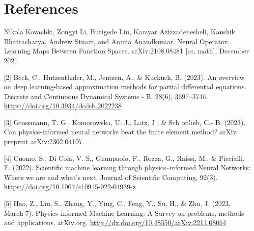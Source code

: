 \documentclass[a4paper, onecolumn, 12pt]{article}
\begin{document}
\newpage
\section*{References}
\singlespacing
[1] Nikola Kovachki, Zongyi Li, Burigede Liu, Kamyar Azizzadenesheli, Kaushik Bhattacharya, Andrew Stuart, and
Anima Anandkumar. Neural Operator: Learning Maps Between Function Spaces. arXiv:2108.08481 [cs, math],
December 2021.

[2] Beck, C., Hutzenthaler, M., Jentzen, A., \& Kuckuck, B. (2023). An overview on deep learning-based approximation methods for partial differential equations. Discrete and Continuous Dynamical Systems - B, 28(6), 3697–3746. \url{https://doi.org/10.3934/dcdsb.2022238 }

[3] Grossmann, T. G., Komorowska, U. J., Latz, J., \& Sch onlieb, C.-
B. (2023). Can physics-informed neural networks beat the finite
element method? arXiv preprint arXiv:2302.04107.

[4] Cuomo, S., Di Cola, V. S., Giampaolo, F., Rozza, G., Raissi, M., \& Piccialli, F. (2022). Scientific machine learning through physics–informed Neural Networks: Where we are and what’s next. Journal of Scientific Computing, 92(3). \url{https://doi.org/10.1007/s10915-022-01939-z} 

[5] Hao, Z., Liu, S., Zhang, Y., Ying, C., Feng, Y., Su, H., \& Zhu, J. (2023, March 7). Physics-informed Machine Learning: A Survey on problems, methods and applications. arXiv.org. \url{http://dx.doi.org/10.48550/arXiv.2211.08064}
\end{document}
